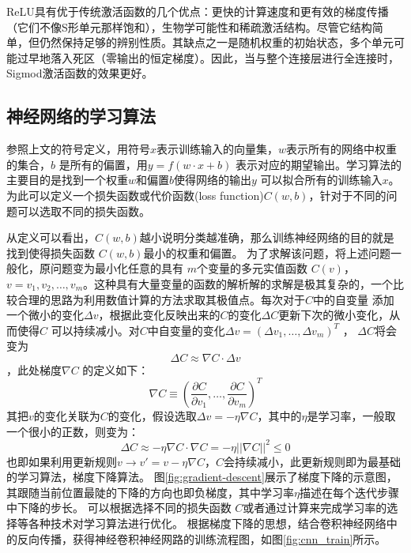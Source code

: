 ReLU具有优于传统激活函数的几个优点：更快的计算速度和更有效的梯度传播（它们不像S形单元那样饱和），生物学可能性和稀疏激活结构。尽管它结构简单，但仍然保持足够的辨别性质。其缺点之一是随机权重的初始状态，多个单元可能过早地落入死区（零输出的恒定梯度）。因此，当与整个连接层进行全连接时，Sigmod激活函数的效果更好。

\subsection{神经网络的学习算法}
参照上文的符号定义，用符号$x $表示训练输入的向量集，$w$表示所有的网络中权重的集合，$b$ 是所有的偏置，用$y=f(w\cdot x + b)$ 表示对应的期望输出。学习算法的主要目的是找到一个权重$w$和偏置$b$使得网络的输出$y$ 可以拟合所有的训练输入$x$。为此可以定义一个损失函数或代价函数(loss function)$C(w,b)$，针对于不同的问题可以选取不同的损失函数。

从定义可以看出，$C(w,b) $越小说明分类越准确，那么训练神经网络的目的就是找到使得损失函数 $C(w,b)$最小的权重和偏置。
为了求解该问题，将上述问题一般化，原问题变为最小化任意的具有 $m $个变量的多元实值函数 $C(v) $， $v=v_1,v_2,\dots,v_m $。这种具有大量变量的函数的解析解的求解是极其复杂的，一个比较合理的思路为利用数值计算的方法求取其极值点。每次对于$C $中的自变量 添加一个微小的变化$\Delta v $，根据此变化反映出来的$C $的变化$\Delta C $更新下次的微小变化，从而使得$C $ 可以持续减小。对$C $中自变量的变化$\Delta v=(\Delta v_1,\dots,\Delta v_m)^T $ ， $\Delta C $将会变为
\begin{equation}
    \Delta C \approx \nabla C \cdot \Delta v
    \label{equ:gradient1}
\end{equation}
，此处梯度$\nabla C $ 的定义如下：
\begin{equation}
\nabla C \equiv (\frac{\partial C}{\partial v_1},\dots,\frac{\partial C}{\partial v_m})^T
\end{equation}
其把$v$的变化关联为$C$的变化，假设选取$\Delta v=-\eta \nabla C $，其中的$\eta $是学习率，一般取一个很小的正数，则变为：
\begin{equation}
\Delta C \approx -\eta\nabla C\cdot\nabla C=-\eta||\nabla C||^2 \leq 0
\end{equation}
也即如果利用更新规则$v \rightarrow v'=v-\eta \nabla C$，$C$会持续减小，此更新规则即为最基础的学习算法，梯度下降算法。
图\ref{fig:gradient-descent}展示了梯度下降的示意图，其跟随当前位置最陡的下降的方向也即负梯度，其中学习率$ \eta $描述在每个迭代步骤中下降的步长。
可以根据选择不同的损失函数 $C $或者通过计算来完成学习率的选择等各种技术对学习算法进行优化。
根据梯度下降的思想，结合卷积神经网络中的反向传播，获得神经卷积神经网路的训练流程图，如图\ref{fig:cnn_train}所示。


